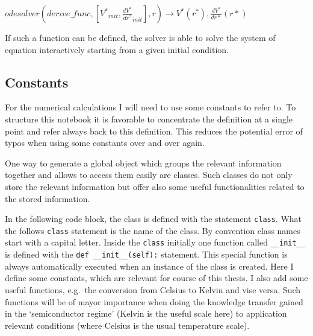 \documentclass[11pt]{article}
\begin{document}
\(odesolver(derive\_func,[V^{*}{}_{init},\frac{dV^{*}}{dr^{*}}_{init}],r)\longrightarrow V^{*}(r^{*}),\frac{dV^{*}}{dr*}(r*)\)

If such a function can be defined, the solver is able to solve the
system of equation interactively starting from a given initial
condition.

    \hypertarget{constants}{%
\subsection{Constants}\label{constants}}

For the numerical calculations I will need to use some constants to
refer to. To structure this notebook it is favorable to concentrate the
definition at a single point and refer always back to this definition.
This reduces the potential error of typos when using some constants over
and over again.

One way to generate a global object which groups the relevant
information together and allows to access them easily are classes. Such
classes do not only store the relevant information but offer also some
useful functionalities related to the stored information.

In the following code block, the class is defined with the statement
\texttt{class}. What the follows \texttt{class} statement is the name of
the class. By convention class names start with a capital letter. Inside
the \texttt{class} initially one function called \texttt{\_\_init\_\_}
is defined with the \texttt{def\ \_\_init\_\_(self):} statement. This
special function is always automatically executed when an instance of
the class is created. Here I define some constants, which are relevant
for course of this thesis. I also add some useful functions, e.g.~the
conversion from Celsius to Kelvin and vise versa. Such functions will be
of mayor importance when doing the knowledge transfer gained in the
`semiconductor regime' (Kelvin is the useful scale here) to application
relevant conditions (where Celsius is the usual temperature scale).
\end{document}
